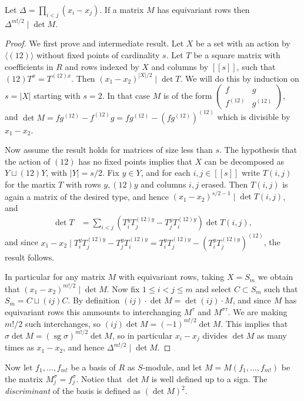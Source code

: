 \documentclass[11pt,fleqn]{article}
\DeclareMathOperator\sg{sg}
\begin{document}
\begin{Lemma}
\label{L:equivariant-rows}
Let $\Delta = \prod_{i < j} (x_i - x_j)$. If a matrix $M$ has equivariant rows 
then $\Delta^{m!/2} \mid \det M$.
\end{Lemma}
\begin{proof}
We first prove and intermediate result. Let $X$ be a set with an action by 
$\langle (12)\rangle$ without fixed points of cardinality $s$. Let $T$ be a 
square matrix with coefficients in $R$ and rows indexed by $X$ and columns by
$[[s]]$, such that $(12)T^x = T^{(12)x}$. Then $(x_1 - x_2)^{|X|/2} \mid \det 
T$. We will do this by induction on $s = |X|$ starting with $s = 2$. In that 
case $M$ is of the form
$\begin{pmatrix}
f & g \\ f^{(12)} & g^{(12)} 
\end{pmatrix}$, and $\det M = fg^{(12)} - f^{(12)}g = fg^{(12)} - 
(fg^{(12)})^{(12)}$ which is divisible by $x_1 - x_2$. 

Now assume the result holds for matrices of size less than $s$.
The hypothesis that the action of $(12)$ has no fixed points implies that 
$X$ can be decomposed as $Y \sqcup (12)Y$, with $|Y| = s/2$. Fix $y \in Y$,
and for each $i,j \in [[s]]$ write $T(i,j)$ for the martix $T$ with rows
$y, (12)y$ and columns $i,j$ erased. Then $T(i,j)$ is again a matrix of the
desired type, and hence $(x_1 - x_2)^{s/2-1} \mid \det T(i,j)$, and
\begin{align*}
\det T
	&= \sum_{i<j} (T^y_i T^{(12)y}_j - T^y_jT^{(12)y}_i) \det T(i,j),
\end{align*}
and since $x_1 - x_2 \mid T^y_i T^{(12)y}_j - T^y_jT^{(12)y}_i = T^y_i 
T^{(12)y}_j - (T^y_iT^{(12)y}_j)^{(12)}$, the result follows. 

In particular for any matrix $M$ with equivariant rows, taking $X = S_m$ we 
obtain that $(x_1 - x_2)^{m!/2} \mid \det M$. Now fix $1 \leq i<j \leq m$ and 
select $C \subset S_m$ such that $S_m = C \sqcup (ij) C$. By definition $(ij) 
\cdot \det M = \det (ij) \cdot M$, and since $M$ has equivariant rows this 
ammounts to interchanging $M^\tau$ and $M^{\sigma \tau}$. We are making $m!/2$ 
such interchanges, so $(ij) \det M = (-1)^{m!/2} \det M$. This implies that
$\sigma \det M = (\sg \sigma)^{m!/2} \det M$, so in particular $x_i - x_j$
divides $\det M$ as many times as $x_1 - x_2$, and hence $\Delta^{m!/2} \mid
\det M$.
\end{proof}



Now let $f_1, \ldots, f_{m!}$ be a basis of $R$ as $S$-module, and let $M = 
M(f_1, \ldots, f_{m!})$ be the matrix $M^\sigma_j = f_j^\sigma$. Notice that 
$\det M$ is well defined up to a sign. The \emph{discriminant} of the basis is 
defined as $(\det M)^2$.
\end{document}
